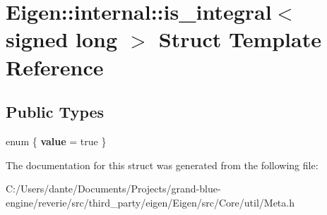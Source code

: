 \hypertarget{struct_eigen_1_1internal_1_1is__integral_3_01signed_01long_01_4}{}\section{Eigen\+::internal\+::is\+\_\+integral$<$ signed long $>$ Struct Template Reference}
\label{struct_eigen_1_1internal_1_1is__integral_3_01signed_01long_01_4}
\subsection*{Public Types}
\begin{DoxyCompactItemize}
\item 
\mbox{\label{struct_eigen_1_1internal_1_1is__integral_3_01signed_01long_01_4_a5e57b9264808af10e06c88208d572dc7}} 
enum \{ {\bfseries value} = true
 \}
\end{DoxyCompactItemize}


The documentation for this struct was generated from the following file\+:\begin{DoxyCompactItemize}
\item 
C\+:/\+Users/dante/\+Documents/\+Projects/grand-\/blue-\/engine/reverie/src/third\+\_\+party/eigen/\+Eigen/src/\+Core/util/Meta.\+h\end{DoxyCompactItemize}
